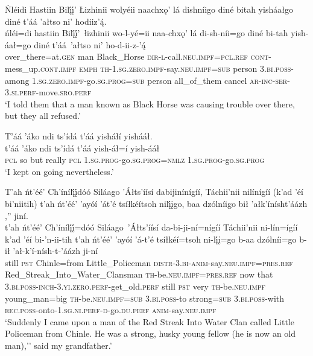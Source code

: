 \ea\label{ex:text2-12-3}
Ńléidi Hastiin Bilį́į́’ Łizhinii wolyéii naachxǫ’ lá dishníigo diné bitah yisháałgo diné t’áá ’ałtso ni’ hodiiz’ą́.\\
\gll ńléi=di	hastiin	Bilį́į́’~{łizhinii}	wo-l-yé=ii	naa-chxǫ’	lá	di-sh-níi=go	diné	bi-tah	yish-áał=go	diné	t’áá~{’ałtso}	ni’	ho-d-ii-z-’ą́\\
     over\_there=at.\textsc{gen}	man	Black\_Horse	\textsc{dir}-\textsc{l}-call.\textsc{neu}.\textsc{impf}=\textsc{pcl}.\textsc{ref}	\textsc{cont}-mess\_up.\textsc{cont}.\textsc{impf}	\textsc{emph}	\textsc{th}-1.\textsc{sg}.\textsc{zero}.\textsc{impf}-say.\textsc{neu}.\textsc{impf}=\textsc{sub}	person	3.\textsc{bi}.\textsc{poss}-among	1.\textsc{sg}.\textsc{zero}.\textsc{impf}-go.\textsc{sg}.\textsc{prog}=\textsc{sub}	person	all\_of\_them	cancel	\textsc{ar}-\textsc{inc}-\textsc{ser}-3.\textsc{si}.\textsc{perf}-move.\textsc{sro}.\textsc{perf}\\
\glt `I told them that a man known as Black Horse was causing trouble over there, but they all refused.'
\z

\ea\label{ex:text2-12-4}
T’áá ’áko ndi ts’ídá t’áá yisháłí yishááł.\\
\gll t’áá	’áko	ndi	ts’ídá	t’áá	yish-áł=í	yish-ááł\\
     \textsc{pcl}	so	but	really	\textsc{pcl}	1.\textsc{sg}.\textsc{prog}-go.\textsc{sg}.\textsc{prog}=\textsc{nmlz}	1.\textsc{sg}.\textsc{prog}-go.\textsc{sg}.\textsc{prog}\\
\glt `I kept on going nevertheless.'
\z

\ea\label{ex:text2-12-5}
T’ah ńt’éé’ Ch’ínílį́į́dóó Siláago ’Áłts’íísí dabijinínígíí, Táchii’nii nilínígíí (k’ad ’éí bi’niitih) t’ah ńt’éé’ ’ayóí ’át’é tsíłkéítsoh nilį́įgo, baa dzólníigo bił ’ałk’ínísht’áázh ,'' jiní.\\
\gll t’ah	ńt’éé’	Ch’ínílį́į́=dóó	Siláago~{’Áłts’íísí}	da-bi-ji-ní=nígíí	Táchii’nii	ni-lín=ígíí	k’ad	’éí	bi-’n-ii-tih	t’ah	ńt’éé’	’ayóí	’á-t’é	tsíłkéí=tsoh	ni-lį́į=go	b-aa	dzólníi=go	b-ił	’ał-k’í-nísh-t-’áázh	ji-ní\\
     still	\textsc{pst}	Chinle=from	Little\_Policeman	\textsc{distr}-3.\textsc{bi}-\textsc{anim}-say.\textsc{neu}.\textsc{impf}=\textsc{pres}.\textsc{ref}	Red\_Streak\_Into\_Water\_Clansman	\textsc{th}-be.\textsc{neu}.\textsc{impf}=\textsc{pres}.\textsc{ref}	now	that	3.\textsc{bi}.\textsc{poss}-\textsc{inch}-3.\textsc{yi}.\textsc{zero}.\textsc{perf}-get\_old.\textsc{perf}	still	\textsc{pst}	very	\textsc{th}-be.\textsc{neu}.\textsc{impf}	young\_man=big	\textsc{th}-be.\textsc{neu}.\textsc{impf}=\textsc{sub}	3.\textsc{bi}.\textsc{poss}-to	strong=\textsc{sub}	3.\textsc{bi}.\textsc{poss}-with	\textsc{rec}.\textsc{poss}-onto-1.\textsc{sg}.\textsc{ni}.\textsc{perf}-\textsc{d}-go.\textsc{du}.\textsc{perf}	\textsc{anim}-say.\textsc{neu}.\textsc{impf}\\
\glt `Suddenly I came upon a man of the Red Streak Into Water Clan called Little Policeman from Chinle. He was a strong, husky young fellow (he is now an old man),'' said my grandfather.'
\z

